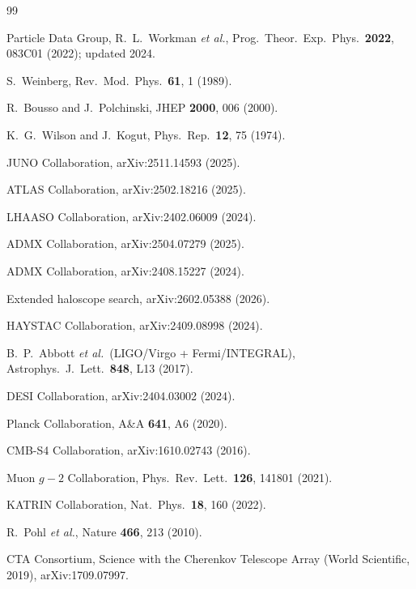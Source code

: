\documentclass[aps,prd,twocolumn,superscriptaddress,longbibliography,nofootinbib]{revtex4-2}
\begin{document}
\begin{thebibliography}{99}

  Particle Data Group, R.~L.~Workman \textit{et al.},
  Prog.\ Theor.\ Exp.\ Phys.\ \textbf{2022}, 083C01 (2022);
  updated 2024.

  S.~Weinberg, Rev.\ Mod.\ Phys.\ \textbf{61}, 1 (1989).

  R.~Bousso and J.~Polchinski, JHEP \textbf{2000}, 006 (2000).

  K.~G.~Wilson and J.~Kogut, Phys.\ Rep.\ \textbf{12}, 75 (1974).

  JUNO Collaboration, arXiv:2511.14593 (2025).

  ATLAS Collaboration, arXiv:2502.18216 (2025).

  LHAASO Collaboration, arXiv:2402.06009 (2024).

  ADMX Collaboration, arXiv:2504.07279 (2025).

  ADMX Collaboration, arXiv:2408.15227 (2024).

  Extended haloscope search, arXiv:2602.05388 (2026).

  HAYSTAC Collaboration, arXiv:2409.08998 (2024).

  B.~P.~Abbott \textit{et al.}\ (LIGO/Virgo + Fermi/INTEGRAL),
  Astrophys.\ J.\ Lett.\ \textbf{848}, L13 (2017).

  DESI Collaboration, arXiv:2404.03002 (2024).

  Planck Collaboration, A\&A \textbf{641}, A6 (2020).

  CMB-S4 Collaboration, arXiv:1610.02743 (2016).

  Muon $g-2$ Collaboration, Phys.\ Rev.\ Lett.\ \textbf{126}, 141801 (2021).

  KATRIN Collaboration, Nat.\ Phys.\ \textbf{18}, 160 (2022).

  R.~Pohl \textit{et al.}, Nature \textbf{466}, 213 (2010).

  CTA Consortium, Science with the Cherenkov Telescope Array
  (World Scientific, 2019), arXiv:1709.07997.


\end{thebibliography}
\end{document}
